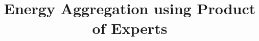 \documentclass[10pt, conference, compsocconf]{IEEEtran}
\begin{document}
%
\title{Energy Aggregation using Product of Experts}



%



\end{document}
